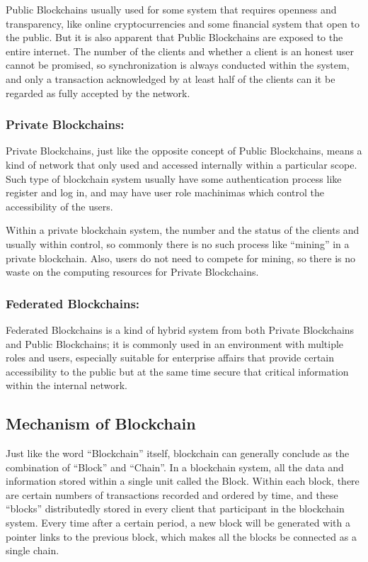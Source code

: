 \documentclass[runningheads]{llncs}
\begin{document}
Public Blockchains usually used for some system that requires openness and transparency, like online cryptocurrencies and some financial system that open to the public. But it is also apparent that Public Blockchains are exposed to the entire internet. The number of the clients and whether a client is an honest user cannot be promised, so synchronization is always conducted within the system, and only a transaction acknowledged by at least half of the clients can it be regarded as fully accepted by the network.

\subsubsection{Private Blockchains:}
Private Blockchains, just like the opposite concept of Public Blockchains, means a kind of network that only used and accessed internally within a particular scope. Such type of blockchain system usually have some authentication process like register and log in, and may have user role machinimas which control the accessibility of the users.

Within a private blockchain system, the number and the status of the clients and usually within control, so commonly there is no such process like “mining” in a private blockchain. Also, users do not need to compete for mining, so there is no waste on the computing resources for Private Blockchains.

\subsubsection{Federated Blockchains:}
Federated Blockchains is a kind of hybrid system from both Private Blockchains and Public Blockchains; it is commonly used in an environment with multiple roles and users, especially suitable for enterprise affairs that provide certain accessibility to the public but at the same time secure that critical information within the internal network.

\subsection{Mechanism of Blockchain}
Just like the word “Blockchain” itself, blockchain can generally conclude as the combination of “Block” and “Chain”. In a blockchain system, all the data and information stored within a single unit called the Block. Within each block, there are certain numbers of transactions recorded and ordered by time, and these “blocks” distributedly stored in every client that participant in the blockchain system. Every time after a certain period, a new block will be generated with a pointer links to the previous block, which makes all the blocks be connected as a single chain.
\end{document}
